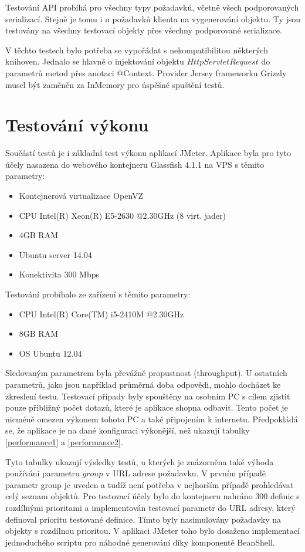 \documentclass[thesis=B,czech]{FITthesis}[2012/06/26]
\begin{document}
  Testování API probíhá pro všechny typy požadavků, včetně všech podporovaných serializací. Stejně je tomu i u požadavků klienta na vygenerování objektu.
  Ty jsou testovány na všechny testovací objekty přes všechny podporované serializace.
  
  V těchto testech bylo potřeba se vypořádat s nekompatibilitou některých knihoven. Jednalo se hlavně o injektování objektu $HttpServletRequest$ do parametrů
  metod přes anotaci @Context. Provider Jersey frameworku Grizzly musel být zaměněn za InMemory pro úspěšné spuštění testů.
  
  \section{Testování výkonu}
  Součástí testů je i základní test výkonu aplikací JMeter. Aplikace byla pro tyto účely nasazena do webového kontejneru Glassfish 4.1.1 na VPS s těmito parametry:
  \begin{itemize}
   \item Kontejnerová virtualizace OpenVZ
   \item CPU Intel(R) Xeon(R) E5-2630 @2.30GHz (8 virt. jader)
   \item 4GB RAM
   \item Ubuntu server 14.04
   \item Konektivita 300 Mbps
  \end{itemize}
  
  Testování probíhalo ze zařízení s těmito parametry:
  \begin{itemize}
   \item CPU Intel(R) Core(TM) i5-2410M @2.30GHz
   \item 8GB RAM
   \item OS Ubuntu 12.04
  \end{itemize}
  
  Sledovaným parametrem byla převážně propustnost (throughput). U ostatních parametrů, jako jsou například průměrná doba odpovědi, mohlo docházet ke zkreslení
  testu. Testovací případy byly spouštěny na osobním PC s cílem zjistit pouze přibližný počet dotazů, které je aplikace shopna odbavit. Tento počet je nicméně
  omezen výkonem tohoto PC a také připojením k internetu. Předpokládá se, že aplikace je na dané konfiguraci výkonější, než ukazují tabulky \ref{performance1} a \ref{performance2}.
  
  Tyto tabulky ukazují výsledky testů, u kterých je znázorněna také výhoda používání parametru $group$ v URL adrese požadavku. V prvním případě parametr group je uveden 
  a tudíž není potřeba v nejhorším případě prohledávat celý seznam objektů. Pro testovací účely bylo do kontejneru nahráno 300 definic s rozdílnými prioritami a implementován testovací parametr
  do URL adresy, který definoval prioritu testované definice. Tímto byly nasimulovány požadavky na objekty s rozdílnou prioritou. V aplikaci JMeter toho bylo
  dosaženo implementací jednoduchého scriptu pro náhodné generování díky komponentě BeanShell.
  
\end{document}
